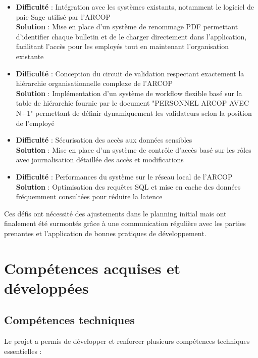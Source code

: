 \begin{itemize}
    \item \textbf{Difficulté} : Intégration avec les systèmes existants, notamment le logiciel de paie Sage utilisé par l'ARCOP\\
    \textbf{Solution} : Mise en place d'un système de renommage PDF permettant d'identifier chaque bulletin et de le charger directement dans l'application, facilitant l'accès pour les employés tout en maintenant l'organisation existante
    
    \item \textbf{Difficulté} : Conception du circuit de validation respectant exactement la hiérarchie organisationnelle complexe de l'ARCOP\\
    \textbf{Solution} : Implémentation d'un système de workflow flexible basé sur la table de hiérarchie fournie par le document "PERSONNEL ARCOP AVEC N+1" permettant de définir dynamiquement les validateurs selon la position de l'employé
    
    \item \textbf{Difficulté} : Sécurisation des accès aux données sensibles\\
    \textbf{Solution} : Mise en place d'un système de contrôle d'accès basé sur les rôles avec journalisation détaillée des accès et modifications
    
    \item \textbf{Difficulté} : Performances du système sur le réseau local de l'ARCOP\\
    \textbf{Solution} : Optimisation des requêtes SQL et mise en cache des données fréquemment consultées pour réduire la latence
\end{itemize}

Ces défis ont nécessité des ajustements dans le planning initial mais ont finalement été surmontés grâce à une communication régulière avec les parties prenantes et l'application de bonnes pratiques de développement.

\section{Compétences acquises et développées}

\subsection{Compétences techniques}
Le projet a permis de développer et renforcer plusieurs compétences techniques essentielles :

